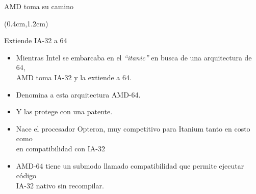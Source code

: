 \documentclass[table,dvipsnames,aspectratio=169]{beamer}
\begin{document}
\begin{frame}{AMD toma su camino}
 \begin{textblock*}{\textwidth}(0.4cm,1.2cm)
  \begin{block}{Extiende IA-32 a \SI{64}{\bit}}
   \begin{itemize}[<+(1)->]\justifying
    \item Mientras Intel se embarcaba en el \textit{``itanic''} en busca de una arquitectura de \SI{64}{\bit},\\
    \textcolor{furfiBlue}{AMD toma IA-32 y la extiende a \SI{64}{\bit}.}
    \item Denomina a esta arquitectura AMD-64.
    \item \textcolor{furfiBlue}{Y las protege con una patente.}
    \item Nace el procesador Opteron, \textcolor{furfiBlue}{muy competitivo para Itanium} tanto en costo como\\
    en compatibilidad con IA-32
    \item AMD-64 tiene un submodo llamado compatibilidad que permite \textcolor{furfiBlue}{ejecutar código\\
    IA-32 nativo sin recompilar}.
   \end{itemize}
  \end{block}
 \end{textblock*}
\end{frame}
\end{document}
